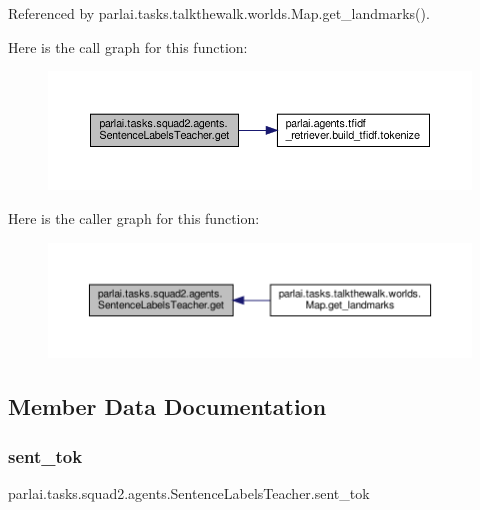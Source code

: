 Referenced by parlai.\+tasks.\+talkthewalk.\+worlds.\+Map.\+get\+\_\+landmarks().

Here is the call graph for this function\+:
\nopagebreak
\begin{figure}[H]
\begin{center}
\leavevmode
\includegraphics[width=350pt]{classparlai_1_1tasks_1_1squad2_1_1agents_1_1SentenceLabelsTeacher_a1af54cd1c62193018fa1961bb985908e_cgraph}
\end{center}
\end{figure}
Here is the caller graph for this function\+:
\nopagebreak
\begin{figure}[H]
\begin{center}
\leavevmode
\includegraphics[width=350pt]{classparlai_1_1tasks_1_1squad2_1_1agents_1_1SentenceLabelsTeacher_a1af54cd1c62193018fa1961bb985908e_icgraph}
\end{center}
\end{figure}


\subsection{Member Data Documentation}
\mbox{\label{classparlai_1_1tasks_1_1squad2_1_1agents_1_1SentenceLabelsTeacher_a38eaa848e9051e5fb1b0a63f2308481e}} 
\subsubsection{\texorpdfstring{sent\+\_\+tok}{sent\_tok}}
{\footnotesize\ttfamily parlai.\+tasks.\+squad2.\+agents.\+Sentence\+Labels\+Teacher.\+sent\+\_\+tok}



